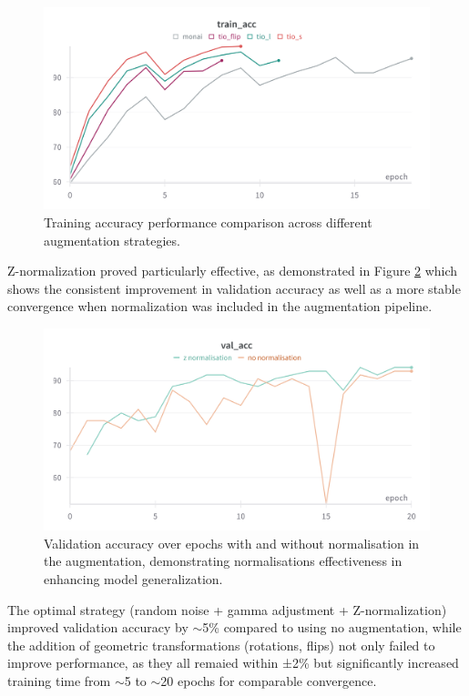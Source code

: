 \documentclass[11pt, a4paper]{article}
\begin{document}
\begin{figure}[htbp]
  \centering
  \includegraphics[width=\textwidth]{figures/augs_train_acc.png}
  \caption{Training accuracy performance comparison across different augmentation strategies.}
  \label{fig:augmentation_comparison}
\end{figure}

Z-normalization proved particularly effective, as demonstrated in Figure \ref{fig:normalisation_accuracy} which shows the consistent improvement in validation accuracy as well as a more stable convergence when normalization was included in the augmentation pipeline.

\begin{figure}[htbp]
  \centering
  \includegraphics[width=\textwidth]{figures/znorm_val_acc.png}
  \caption{Validation accuracy over epochs with and without normalisation in the augmentation, demonstrating normalisations effectiveness in enhancing model generalization.}
  \label{fig:normalisation_accuracy}
\end{figure}

The optimal strategy (random noise + gamma adjustment + Z-normalization) improved validation accuracy by $\sim$5\% compared to using no augmentation, while the addition of geometric transformations (rotations, flips) not only failed to improve performance, as they all remaied within ±2\% but significantly increased training time from $\sim$5 to $\sim$20 epochs for comparable convergence.
\end{document}
